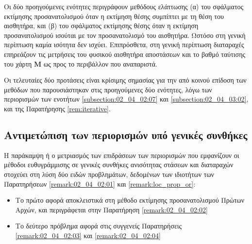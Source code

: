 Οι δύο προηγούμενες ενότητες περιγράφουν μεθόδους ελάττωσης (α) του σφάλματος
εκτίμησης προσανατολισμού όταν η εκτίμηση θέσης συμπίπτει με τη θέση του
αισθητήρα, και (β) του σφάλματος εκτίμησης θέσης όταν η εκτίμηση
προσανατολισμού ισούται με τον προσανατολισμό του αισθητήρα. Ωστόσο στη γενική
περίπτωση καμία ισότητα δεν ισχύει. Επιπρόσθετα, στη γενική περίπτωση
διαταραχές επηρεάζουν τις μετρήσεις του φυσικού αισθητήρα αποστάσεων και το
βαθμό ταύτισης του χάρτη $\bm{M}$ ως προς το περιβάλλον που αναπαριστά.

Οι τελευταίες δύο προτάσεις είναι κρίσιμης σημασίας για την από κοινού επίδοση
των μεθόδων που παρουσιάστηκαν στις προηγούμενες δύο ενότητες, λόγω των
περιορισμών των ενοτήτων \ref{subsection:02_04_02:07} και
\ref{subsection:02_04_03:02}, και της Παρατήρησης \ref{rem:iterative}.

\subsection{Αντιμετώπιση των περιορισμών υπό γενικές συνθήκες}
\label{subsection:02_04_04:01}

Η παράκαμψη ή ο μετριασμός των επιδράσεων των περιορισμών που εμφανίζουν οι
μέθοδοι ευθυγράμμισης σε γενικές συνθήκες ανισότητας στάσεων και διαταραχών
στοχεύει στη λύση δύο ειδών προβλημάτων, δεδομένων των ιδιοτήτων των
Παρατηρήσεων \ref{remark:02_04_02:01} και \ref{remark:loc_prop_or}:

\begin{itemize}
  \item Το πρώτο αφορά αποκλειστικά στη μέθοδο εκτίμησης προσανατολισμού
        Πρώτων Αρχών, και περιγράφεται στην Παρατήρηση \ref{remark:02_04_02:02}
  \item Το δεύτερο πρόβλημα αφορά στις συγγενείς Παρατηρήσεις
        \ref{remark:02_04_02:03} και \ref{remark:02_04_02:04}
\end{itemize}


